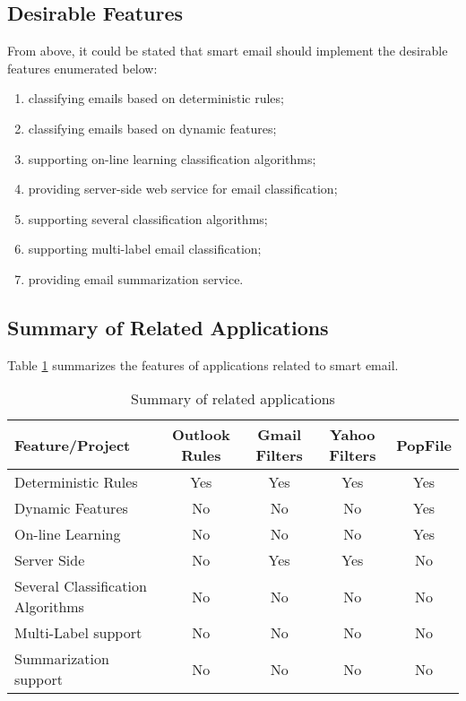 \subsection{Desirable Features}
\label{desirable_features}
From above, it could be stated that smart email should implement the desirable features enumerated below:
\begin{enumerate}
  \item classifying emails based on deterministic rules;
  \item classifying emails based on dynamic features;
  \item supporting on-line learning classification algorithms;
  \item providing server-side web service for email classification;
  \item supporting several classification algorithms;
  \item supporting multi-label email classification;
  \item providing email summarization service.
\end{enumerate}


\subsection{Summary of Related Applications}
Table \ref{related_applications_summary} summarizes the features of applications related to smart email.

\begin{center}
  \begin{table}[H]
    \begin{tabular}{ | p{3cm} | c | c | c | c |}
      \hline
      Feature/Project              & Outlook Rules \cite{OUTLOOK_REF} & Gmail Filters \cite{GMAIL_FILTERS} & 
                        Yahoo Filters \cite{YAHOO_FILTERS} & PopFile \cite{POPFILE} \\ \hline
      Deterministic Rules  &    Yes        &    Yes        &    Yes      &    Yes  \\ \hline     
      Dynamic Features &    No        &    No         &    No        &    Yes  \\ \hline
      On-line Learning &    No        &    No         &    No        &    Yes  \\ \hline
      Server Side      &    No        &    Yes        &    Yes       &    No   \\ \hline
      Several Classification Algorithms &    No        &    No &    No       &    No   \\ \hline
      Multi-Label support &    No        &    No &    No       &    No   \\ \hline
      Summarization support&    No        &    No &    No       &    No   \\ \hline
    \end{tabular}
    \caption[Summary of related work]{Summary of related applications}
    \label{related_applications_summary}
  \end{table}
\end{center}  


